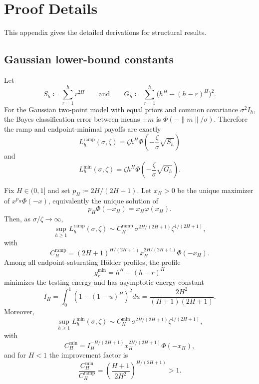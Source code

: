 \section{Proof Details}\label{app:proof_details}

This appendix gives the detailed derivations for structural results.

\subsection{Gaussian lower-bound constants}

Let
\[
  S_h\coloneqq \sum_{r=1}^h r^{2H}
  \qquad\text{and}\qquad
  G_h\coloneqq \sum_{r=1}^h \bigl(h^H-(h-r)^H\bigr)^2.
\]
For the Gaussian two-point model with equal priors and common covariance
$\sigma^2 I_h$, the Bayes classification error between means $\pm m$ is
$\Phi(-\|m\|/\sigma)$. Therefore the ramp and endpoint-minimal payoffs are
exactly
\[
  L_h^{\mathrm{ramp}}(\sigma,\zeta)
  =
  \zeta h^H\Phi\!\left(-\frac{\zeta}{\sigma}\sqrt{S_h}\right)
\]
and
\[
  L_h^{\min}(\sigma,\zeta)
  =
  \zeta h^H\Phi\!\left(-\frac{\zeta}{\sigma}\sqrt{G_h}\right).
\]

\begin{proposition}
\label{prop:gaussian_lower_bound_constants}
Fix $H\in(0,1]$ and set $p_H \coloneqq 2H/(2H+1)$. Let $x_H>0$ be the unique
maximizer of $x^{p_H}\Phi(-x)$, equivalently the unique solution of
\[
  p_H\Phi(-x_H)=x_H\varphi(x_H).
\]
Then, as $\sigma/\zeta\to\infty$,
\[
  \sup_{h\ge 1} L_h^{\mathrm{ramp}}(\sigma,\zeta)
  \sim
  C_H^{\mathrm{ramp}}\,\sigma^{2H/(2H+1)}\zeta^{1/(2H+1)},
\]
with
\[
  C_H^{\mathrm{ramp}}
  =
  (2H+1)^{H/(2H+1)}x_H^{2H/(2H+1)}\Phi(-x_H).
\]
Among all endpoint-saturating H\"older profiles, the profile
\[
  g_r^{\min}=h^H-(h-r)^H
\]
minimizes the testing energy and has asymptotic energy constant
\[
  I_H
  =
  \int_0^1 \left(1-(1-u)^H\right)^2du
  =
  \frac{2H^2}{(H+1)(2H+1)}.
\]
Moreover,
\[
  \sup_{h\ge 1}L_h^{\min}(\sigma,\zeta)
  \sim
  C_H^{\min}\,\sigma^{2H/(2H+1)}\zeta^{1/(2H+1)},
\]
with
\[
  C_H^{\min}
  =
  I_H^{-H/(2H+1)}x_H^{2H/(2H+1)}\Phi(-x_H),
\]
and for $H<1$ the improvement factor is
\[
  \frac{C_H^{\min}}{C_H^{\mathrm{ramp}}}
  =
  \left(\frac{H+1}{2H^2}\right)^{H/(2H+1)}
  >1.
\]
\end{proposition}

